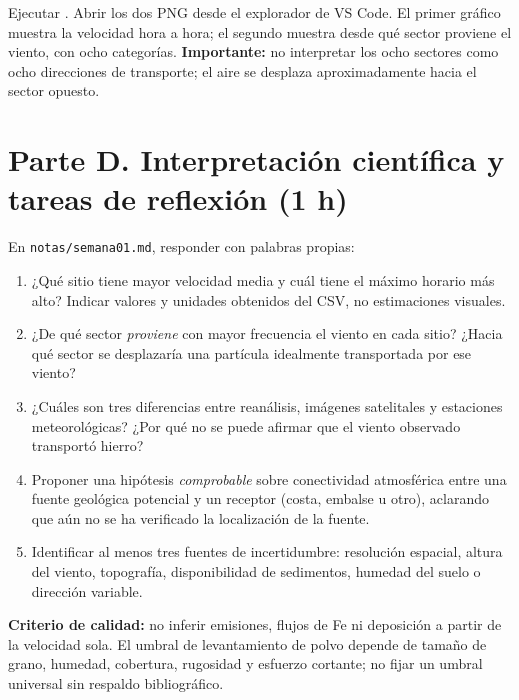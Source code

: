 \documentclass[11pt,a4paper]{article}
\begin{document}
Ejecutar . Abrir los dos PNG desde el explorador de VS Code. El primer gráfico muestra la velocidad hora a hora; el segundo muestra desde qué sector proviene el viento, con ocho categorías. \textbf{Importante:} no interpretar los ocho sectores como ocho direcciones de transporte; el aire se desplaza aproximadamente hacia el sector opuesto.

\section{Parte D. Interpretación científica y tareas de reflexión (1 h)}

En \texttt{notas/semana01.md}, responder con palabras propias:

\begin{enumerate}[leftmargin=*]

\item ¿Qué sitio tiene mayor velocidad media y cuál tiene el máximo horario más alto? Indicar valores y unidades obtenidos del CSV, no estimaciones visuales.

\item ¿De qué sector \emph{proviene} con mayor frecuencia el viento en cada sitio? ¿Hacia qué sector se desplazaría una partícula idealmente transportada por ese viento?

\item ¿Cuáles son tres diferencias entre reanálisis, imágenes satelitales y estaciones meteorológicas? ¿Por qué no se puede afirmar que el viento observado transportó hierro?

\item Proponer una hipótesis \emph{comprobable} sobre conectividad atmosférica entre una fuente geológica potencial y un receptor (costa, embalse u otro), aclarando que aún no se ha verificado la localización de la fuente.

\item Identificar al menos tres fuentes de incertidumbre: resolución espacial, altura del viento, topografía, disponibilidad de sedimentos, humedad del suelo o dirección variable.

\end{enumerate}

\textbf{Criterio de calidad:} no inferir emisiones, flujos de Fe ni deposición a partir de la velocidad sola. El umbral de levantamiento de polvo depende de tamaño de grano, humedad, cobertura, rugosidad y esfuerzo cortante; no fijar un umbral universal sin respaldo bibliográfico.
\end{document}

